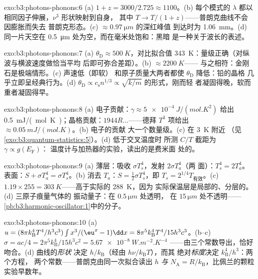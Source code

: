 \begin{solution}{exo:b3:photons-phonons:6}
(a) $1 + z = 3000/2.725 \approx 1100$。(b) 每个模式的 $\lambda$
都以相同因子伸展，$\nu^3$ 形状映射到自身，
其中 $T \to T/(1+z)$——普朗克曲线不会因膨胀而失去
普朗克形态。(c) $\approx\qty{0.97}{\micro m}$ 的深红峰值
到达时为 \qty{1.06}{mm}。(d) 同一片天空在
\qty{0.5}{\micro m} 处为空，而在毫米处饱和：黑暗
是一种关于波长的表述。
\end{solution}

\begin{solution}{exo:b3:photons-phonons:7}
(a) $\theta_{\text{D}} \approx \qty{500}{K}$，对比拟合值
\qty{343}{K}：量级正确（对纵波与横波速度做恰当平均
后即可弥合差距）。(b) $\approx\qty{2200}{K}$——
与之相符：金刚石是极端情形。(c) 声速低（即软）
和原子质量大两者都使 $\theta_{\text{D}}$ 降低：铅的晶格
几乎立即呈经典行为。(d) $\theta_{\text{D}} \propto
c_{\text{s}}n^{1/3} \propto \sqrt{k/m}$ 的形式，刚而轻
者凝固得晚，软而重者凝固得早。
\end{solution}

\begin{solution}{exo:b3:photons-phonons:8}
(a) 电子贡献：$\gamma \approx \qty{5e-4}{J/(mol.K^2)}$ 给出
\qty{0.5}{mJ/(mol.K)}；晶格贡献：$1944R\dots$——德拜 $T^3$
项给出 $\approx\qty{0.05}{mJ/(mol.K)}$。(b) 电子的贡献
大一个数量级。(c) 在 \qty{3}{K} 附近
（见\cref{exo:b3:quantum-statistics:5}）。(d) 低于交叉温度时
所测 $C/T$ 截距为 $\gamma \propto g(E_{\text{F}})$：
温度计与加热器的实验，读出的是费米面
处的。
\end{solution}

\begin{solution}{exo:b3:photons-phonons:9}
(a) 薄层：吸收 $\sigma T_s^4$，发射 $2\sigma T_a^4$（两
面）：$T_s^4 = 2T_a^4$。表面：$S + \sigma T_a^4 = \sigma
T_s^4$。(b) 消去 $T_a$：$S = \tfrac12\sigma T_s^4$，即
$T_s = 2^{1/4}T_{\text{有效}}$。(c) $1.19 \times 255 =
\qty{303}{K}$——高于实际的 \qty{288}{K}，因为
实际保温层是局部的、分层的。(d) 三原子痕量气体的
振动量子：在 $0.5\,\unit{\micro m}$ 处透明，
在 $15\,\unit{\micro m}$ 处不透明——
\cref{pb:b3:harmonic-oscillator:1}中的分子。
\end{solution}

\begin{solution}{exo:b3:photons-phonons:10}
(a) $u = (8\pi k_{\text{B}}^4T^4/h^3c^3)\int x^3/(\eu^x - 1)\dd x
= 8\pi^5k_{\text{B}}^4T^4/15h^3c^3$。(b--c) $\sigma = ac/4 =
2\pi^5k_{\text{B}}^4/15h^3c^2 = \qty{5.67e-8}{W.m^{-2}.K^{-4}}$
——由三个常数导出，恰好吻合。(d) 曲线的\emph{形状}
决定 $h/k_{\text{B}}$（经由 $h\nu/k_{\text{B}}T$），而其
绝对\emph{标度}决定 $k_{\text{B}}^4/h^3$：两个方程，
两个常数——普朗克由同一次拟合读出 $h$ \emph{与} $N_{\text{A}} =
R/k_{\text{B}}$，比佩兰的颗粒实验早数年。
\end{solution}

